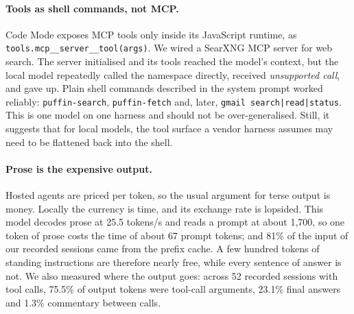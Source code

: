 \documentclass[11pt]{article}
\newcommand{\code}[1]{\texttt{#1}}
\begin{document}
\paragraph{Tools as shell commands, not MCP.} Code Mode exposes MCP tools only inside its JavaScript
runtime, as \code{tools.mcp\_\_server\_\_tool(args)}. We wired a SearXNG \cite{searxng} MCP server
for web search. The server initialised and its tools reached the model's context, but the local
model repeatedly called the namespace directly, received \emph{unsupported call}, and gave up.
Plain shell commands described in the system prompt worked reliably:
\code{puffin-search}, \code{puffin-fetch} and, later, \code{gmail search|read|status}. This is one
model on one harness and should not be over-generalised. Still, it suggests that for local models,
the tool surface a vendor harness assumes may need to be flattened back into the shell.

\paragraph{Prose is the expensive output.} Hosted agents are priced per token, so the usual argument
for terse output is money. Locally the currency is time, and its exchange rate is lopsided. This
model decodes prose at 25.5 tokens/s and reads a prompt at about 1{,}700, so one token of prose
costs the time of about 67 prompt tokens; and 81\% of the input of our recorded sessions came from
the prefix cache. A few hundred tokens of standing instructions are therefore nearly free, while
every sentence of answer is not. We also measured where the output goes: across 52 recorded
sessions with tool calls, 75.5\% of output tokens were tool-call arguments, 23.1\% final answers
and 1.3\% commentary between calls.
\end{document}
